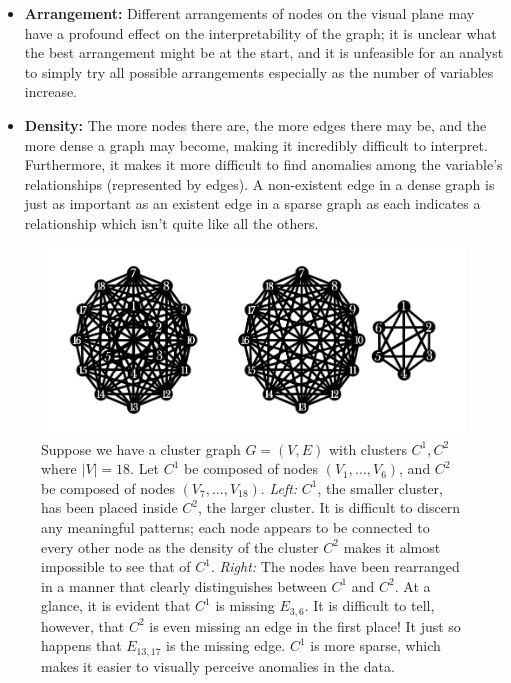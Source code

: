 \tablespacing
\begin{itemize}
	\item \textbf{Arrangement:} Different arrangements of nodes on the visual 
	plane may have a profound effect on the interpretability of the graph; it 
	is unclear what the best arrangement might be at the start, and it is 
	unfeasible for an analyst to simply try all possible arrangements 
	especially as the number of variables increase.
	
	\item \textbf{Density:} The more nodes there are, the more edges there may 
	be, and the more dense a graph may become, making it incredibly difficult 
	to interpret. Furthermore, it makes it more difficult to find anomalies 
	among the variable's relationships (represented by edges). A non-existent 
	edge in a dense graph is just as important as an existent edge in a sparse 
	graph as each indicates a relationship which isn't quite like all the 
	others.
\end{itemize}
\bodyspacing

\begin{figure}[htb]
	\begin{center}
		\includegraphics[width=1\linewidth]{ch-gc/figures/arr_density}
		\caption[Difficulties with graph visualization.]{
		Suppose we have a cluster graph $G=(V,E)$ with clusters $C^1,C^2$ where 
		$|V|=18$. 
		Let $C^1$ be composed of nodes $(V_1,...,V_6)$, and $C^2$ be composed 
		of nodes $(V_7,...,V_{18})$. 
		\textit{Left:} $C^1$, the smaller cluster, has been placed inside 
		$C^2$, the larger cluster. It is difficult to discern any meaningful 
		patterns; each node appears to be connected to every other node as the 
		density of the cluster $C^2$ makes it almost impossible to see that of 
		$C^1$.
		\textit{Right:} The nodes have been rearranged in a manner that clearly 
		distinguishes between $C^1$ and $C^2$. At a glance, it is evident that 
		$C^1$ is missing $E_{3,6}$. It is difficult to tell, however, that 
		$C^2$ is even missing an edge in the first place! It just so happens 
		that $E_{13,17}$ is the missing edge.
		$C^1$ is more sparse, which makes it easier to visually perceive 
		anomalies in the data.}
		\label{fig:gc:arr_density}
	\end{center}
\end{figure}

